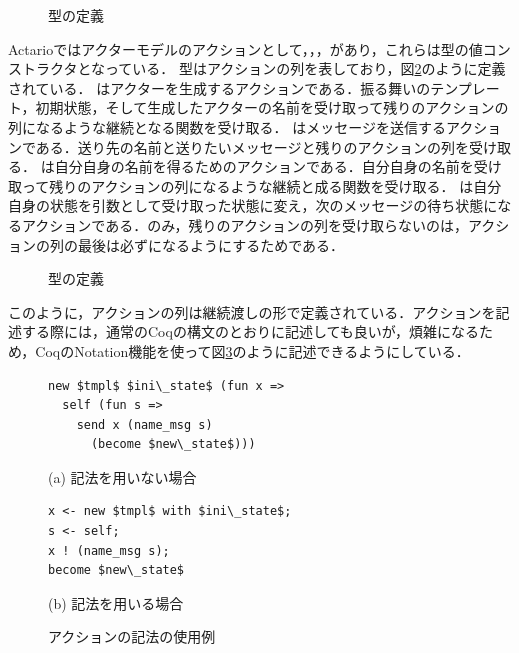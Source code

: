 \begin{figure}
  
  \label{code:overview:behavior}
  \caption{型の定義}
\end{figure}

Actarioではアクターモデルのアクションとして，，，があり，これらは型の値コンストラクタとなっている．
型はアクションの列を表しており，図\ref{code:overview:actions}のように定義されている．
はアクターを生成するアクションである．振る舞いのテンプレート，初期状態，そして生成したアクターの名前を受け取って残りのアクションの列になるような継続となる関数を受け取る．
はメッセージを送信するアクションである．送り先の名前と送りたいメッセージと残りのアクションの列を受け取る．
は自分自身の名前を得るためのアクションである．自分自身の名前を受け取って残りのアクションの列になるような継続と成る関数を受け取る．
は自分自身の状態を引数として受け取った状態に変え，次のメッセージの待ち状態になるアクションである．のみ，残りのアクションの列を受け取らないのは，アクションの列の最後は必ずになるようにするためである．

\begin{figure}
  
  \label{code:overview:actions}
  \caption{型の定義}
\end{figure}

このように，アクションの列は継続渡しの形で定義されている．アクションを記述する際には，通常のCoqの構文のとおりに記述しても良いが，煩雑になるため，CoqのNotation機能を使って図\ref{code:overview:notation}のように記述できるようにしている．

\begin{figure}\centering
\begin{minipage}{0.42\textwidth}\centering
\begin{lstlisting}[frame=single,numbers=none,xleftmargin=0pt]
new $tmpl$ $ini\_state$ (fun x =>
  self (fun s =>
    send x (name_msg s)
      (become $new\_state$)))
\end{lstlisting}
(a) 記法を用いない場合
\end{minipage}
\hspace*{3ex}
\begin{minipage}{0.42\textwidth}\centering
\begin{lstlisting}[frame=single,numbers=none,xleftmargin=0pt]
x <- new $tmpl$ with $ini\_state$;
s <- self;
x ! (name_msg s);
become $new\_state$
\end{lstlisting}
(b) 記法を用いる場合
\end{minipage}
\caption{アクションの記法の使用例}\label{code:overview:notation}
\end{figure}


